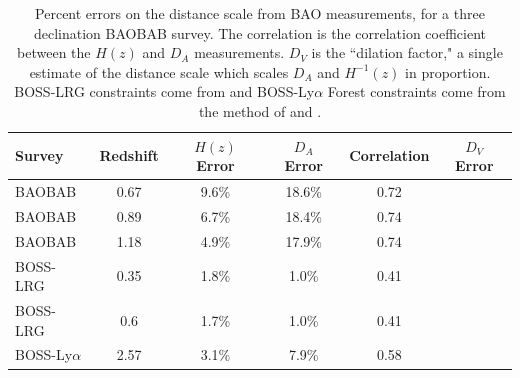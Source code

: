 \documentclass[10pt,iop]{emulateapj}
\begin{document}
\begin{table}[ht]\centering
\caption{Percent errors on the distance scale from BAO measurements,  
for a three declination BAOBAB survey.
The correlation is the correlation coefficient between the $H(z)$ and $D_A$ measurements.  
$D_V$ is the ``dilation factor," a single estimate of
the distance scale which scales $D_A$ and $H^{-1}(z)$ in proportion.
BOSS-LRG constraints come from
\citet{schlegel_et_al_2009} and BOSS-Ly$\alpha$ Forest constraints come from the method of
\citet{mcdonald_and_eisenstein_2007} and \citet{dawson_et_al_2012}.}
\begin{tabular}{l|ccccc}
Survey & Redshift & $H(z)$ Error & $D_A$ Error & Correlation & $D_V$ Error\\
\hline\hline
BAOBAB & 0.67 & 9.6\% & 18.6\% & 0.72 & \\
BAOBAB & 0.89 & 6.7\% & 18.4\% & 0.74 & \\
BAOBAB & 1.18 & 4.9\% & 17.9\% & 0.74 & \\
\hline
BOSS-LRG & 0.35 & 1.8\% & 1.0\% & 0.41 & \\
BOSS-LRG & 0.6 & 1.7\% & 1.0\% & 0.41 & \\
\hline
BOSS-Ly$\alpha$ & 2.57 & 3.1\% & 7.9\% & 0.58 & \\
\end{tabular}
\label{tab:constraints}
\end{table}
\end{document}
